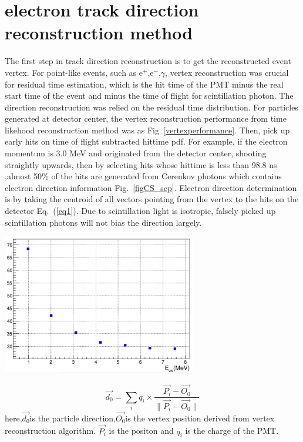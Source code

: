 \documentclass[a4paper,10pt]{cpc-hepnp}
\begin{document}
\section{electron track direction reconstruction method}
The first step in track direction reconstruction is to get the reconstructed event vertex.
For point-like events, such as e$^+$,e$^-$,$\gamma$, vertex reconstruction was crucial for 
residual time estimation, which is the hit time of the PMT minus the real start time of the event and minus the time of flight for
scintillation photon. The direction reconstruction was relied on the residual time distribution.
For particles generated at detector center, the vertex reconstruction performance from time likehood reconstruction method
was as Fig~\ref{vertexperformance}.
Then, pick up early hits on time of flight subtracted hittime pdf.
For example, if the electron momentum is 3.0 MeV and originated
from the detector center, shooting straightly upwards, then by selecting hits whose hittime is less than 98.8 ns ,almost 50\% of
the hits are generated from Cerenkov photons which contains electron direction information Fig.~\ref{figCS_sep}.
Electron direction determination is by taking the centroid of all vectors pointing from  the vertex to the hits on the
detector Eq.~(\ref{eq1}). Due to scintillation light is isotropic, falsely
picked up scintillation photons will not bias the direction largely.
\begin{center}
\includegraphics[width=8.5cm]{plots/vertexper}
\end{center}

\begin{equation}
\label{eq1}
\vec{d_0} = \sum_i{q_i\times{\frac{\vec{P_i}- \vec{O_0}}{\|\vec{P_i}-
\vec{O_0}\|}}}
\end{equation}
here,$\vec{d_0}$is the particle direction,$\vec{O_0}$is the vertex position
derived from vertex reconstruction algorithm.
 $\vec{P_i}$ is the positon and $q_i$ is the charge of the PMT.
\end{document}
